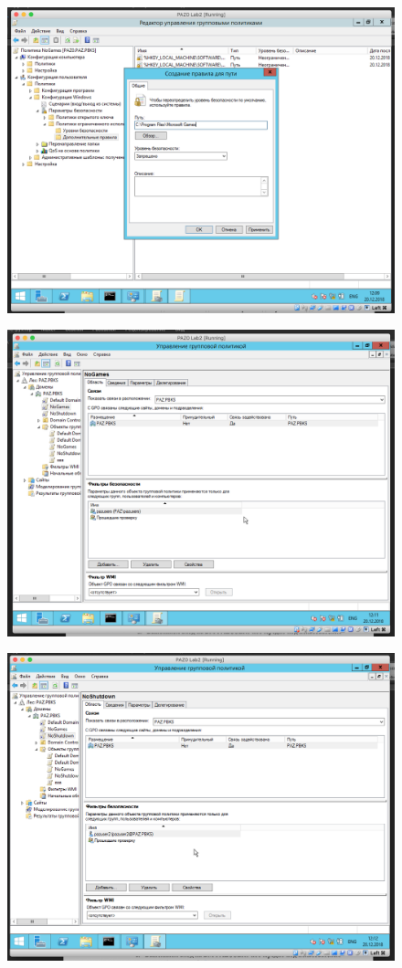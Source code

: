 \begin{figure}[H]
	\centering
	\includegraphics[width=.8\textwidth]{images/9.png}
\end{figure}

\begin{figure}[H]
	\centering
	\includegraphics[width=.8\textwidth]{images/10.png}
\end{figure}

\begin{figure}[H]
	\centering
	\includegraphics[width=.8\textwidth]{images/11.png}
\end{figure}

